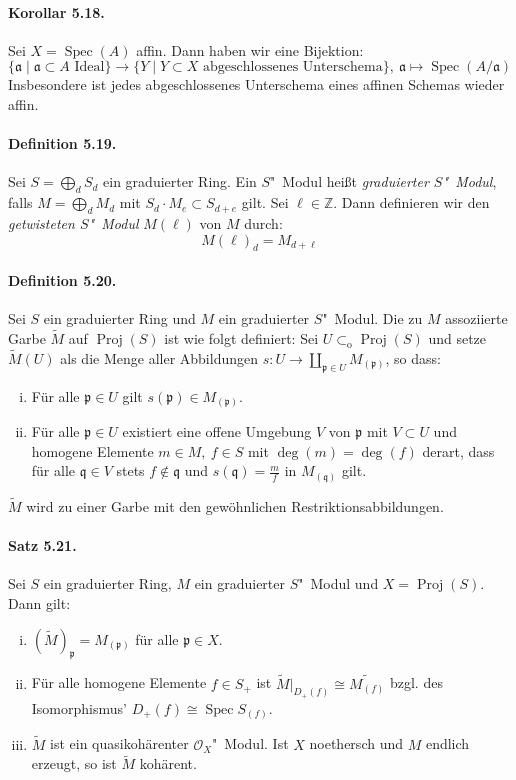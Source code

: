 \paragraph{Korollar 5.18.}\label{5.18} Sei $X=\operatorname{Spec}(A)$ affin. Dann haben wir eine Bijektion:
\[\{\mathfrak{a}\mid \mathfrak{a}\subset A \text{ Ideal}\}\to \{Y\mid Y\subset X \text{ abgeschlossenes Unterschema}\},\ \mathfrak{a}\mapsto \operatorname{Spec}(A/\mathfrak{a}) \]
Insbesondere ist jedes abgeschlossenes Unterschema eines affinen Schemas wieder affin.

\paragraph{Definition 5.19.}\label{5.19} Sei $S=\bigoplus_d S_d$ ein graduierter Ring. Ein $S$"~Modul heißt \textit{graduierter $S$"~Modul}, falls $M=\bigoplus_d M_d$ mit $S_d\cdot M_e\subset S_{d+e}$ gilt. Sei $\ell\in\mathbb{Z}$. Dann definieren wir den \textit{getwisteten $S$"~Modul} $M(\ell)$ von $M$ durch:
\[M(\ell)_d = M_{d+\ell} \]

\paragraph{Definition 5.20.}\label{5.20} Sei $S$ ein graduierter Ring und $M$ ein graduierter $S$"~Modul. Die zu $M$ assoziierte Garbe $\widetilde{M}$ auf $\operatorname{Proj}(S)$ ist wie folgt definiert: Sei $U\subset_\text{o}\operatorname{Proj}(S)$ und setze $\widetilde{M}(U)$ als die Menge aller Abbildungen $s:U\to\coprod_{\mathfrak{p}\in U}M_{(\mathfrak{p})}$, so dass:
\begin{enumerate}[(i)]
\item Für alle $\mathfrak{p}\in U$ gilt $s(\mathfrak{p})\in M_{(\mathfrak{p})}$.
\item Für alle $\mathfrak{p}\in U$ existiert eine offene Umgebung $V$ von $\mathfrak{p}$ mit $V\subset U$ und homogene Elemente $m\in M,\ f\in S$ mit $\deg(m)=\deg(f)$ derart, dass für alle $\mathfrak{q}\in V$ stets $f\not\in\mathfrak{q}$ und $s(\mathfrak{q})=\frac{m}{f}$ in $M_{(\mathfrak{q})}$ gilt.
\end{enumerate}
$\widetilde{M}$ wird zu einer Garbe mit den gewöhnlichen Restriktionsabbildungen.

\paragraph{Satz 5.21.}\label{5.21} Sei $S$ ein graduierter Ring, $M$ ein graduierter $S$"~Modul und $X=\operatorname{Proj}(S)$. Dann gilt:
\begin{enumerate}[(i)]
\item $(\widetilde{M})_\mathfrak{p}=M_{(\mathfrak{p})}$ für alle $\mathfrak{p}\in X$.
\item Für alle homogene Elemente $f\in S_+$ ist $\widetilde{M}|_{D_+(f)}\cong\widetilde{M_{(f)}}$ bzgl. des Isomorphismus' $D_+(f)\cong\operatorname{Spec}S_{(f)}$.
\item $\widetilde{M}$ ist ein quasikohärenter $\mathcal{O}_X$"~Modul. Ist $X$ noethersch und $M$ endlich erzeugt, so ist $\widetilde{M}$ kohärent.
\end{enumerate}

